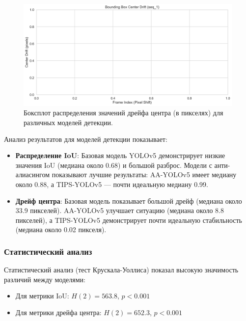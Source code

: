 \begin{figure}[ht]
\centering
\includegraphics[width=\textwidth]{images/detection/center_drift_comparison_seq_1.png}
\caption{Боксплот распределения значений дрейфа центра (в пикселях) для различных моделей детекции.}
\label{fig:boxplot_center_shift}
\end{figure}

Анализ результатов для моделей детекции показывает:

\begin{itemize}
    \item \textbf{Распределение IoU}: Базовая модель YOLOv5 демонстрирует низкие значения IoU (медиана около 0.68) и большой разброс. Модели с анти-алиасингом показывают лучшие результаты: AA-YOLOv5 имеет медиану около 0.88, а TIPS-YOLOv5 — почти идеальную медиану 0.99.
    \item \textbf{Дрейф центра}: Базовая модель показывает большой дрейф (медиана около 33.9 пикселей). AA-YOLOv5 улучшает ситуацию (медиана около 8.8 пикселей), а TIPS-YOLOv5 демонстрирует почти идеальную стабильность (медиана около 0.02 пикселя).
\end{itemize}

\subsubsection{Статистический анализ}
\label{sec:experiments:detection:statistics}

Статистический анализ (тест Крускала-Уоллиса) показал высокую значимость различий между моделями:
\begin{itemize}
    \item Для метрики IoU: $H(2) = 563.8$, $p < 0.001$
    \item Для метрики дрейфа центра: $H(2) = 652.3$, $p < 0.001$
\end{itemize}


